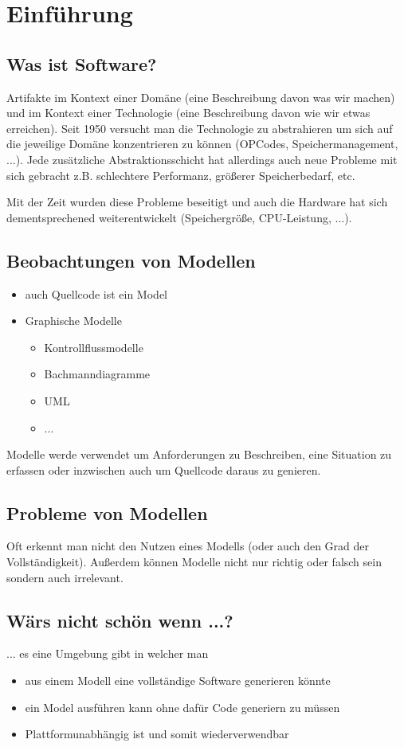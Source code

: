 \chapter{Einführung}

\section{Was ist Software?}
Artifakte im Kontext einer Domäne (eine Beschreibung davon was wir machen) und im Kontext einer Technologie (eine Beschreibung davon wie wir etwas erreichen). Seit 1950 versucht man die Technologie zu abstrahieren um sich auf die jeweilige Domäne konzentrieren zu können (OPCodes, Speichermanagement, ...). Jede zusätzliche Abstraktionsschicht hat allerdings auch neue Probleme mit sich gebracht z.B. schlechtere Performanz, größerer Speicherbedarf, etc. 

Mit der Zeit wurden diese Probleme beseitigt und auch die Hardware hat sich dementsprechened weiterentwickelt (Speichergröße, CPU-Leistung, ...). 

\section{Beobachtungen von Modellen}
\begin{itemize}
\item auch Quellcode ist ein Model
\item Graphische Modelle
\begin{itemize}
\item Kontrollflussmodelle
\item Bachmanndiagramme
\item UML
\item ...
\end{itemize}
\end{itemize}

Modelle werde verwendet um Anforderungen zu Beschreiben, eine Situation zu erfassen oder inzwischen auch um Quellcode daraus zu genieren.

\section{Probleme von Modellen}
Oft erkennt man nicht den Nutzen eines Modells (oder auch den Grad der Vollständigkeit). Außerdem können Modelle nicht nur richtig oder falsch sein sondern auch irrelevant.

\section{Wärs nicht schön wenn ...?}
... es eine Umgebung gibt in welcher man 
\begin{itemize}
\item aus einem Modell eine vollständige Software generieren könnte
\item ein Model ausführen kann ohne dafür Code generiern zu müssen
\item Plattformunabhängig ist und somit wiederverwendbar
\end{itemize}

